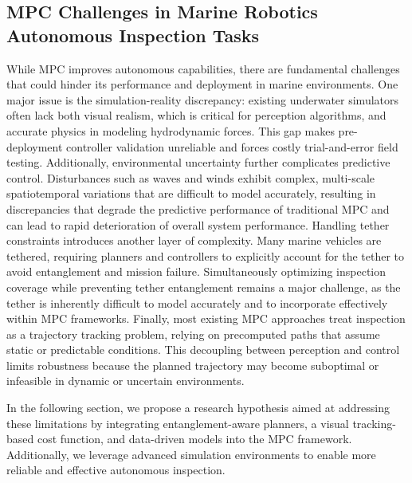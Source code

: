 \subsection{\ac{MPC} Challenges in Marine Robotics Autonomous Inspection Tasks}

While MPC improves autonomous capabilities, there are fundamental challenges that could hinder its performance and deployment in marine environments. One major issue is the simulation-reality discrepancy: existing underwater simulators often lack both visual realism, which is critical for perception algorithms, and accurate physics in modeling hydrodynamic forces. This gap makes pre-deployment controller validation unreliable and forces costly trial-and-error field testing. Additionally, environmental uncertainty further complicates predictive control. Disturbances such as waves and winds exhibit complex, multi-scale spatiotemporal variations that are difficult to model accurately, resulting in discrepancies that degrade the predictive performance of traditional MPC and can lead to rapid deterioration of overall system performance. Handling tether constraints introduces another layer of complexity. Many marine vehicles are tethered, requiring planners and controllers to explicitly account for the tether to avoid entanglement and mission failure. Simultaneously optimizing inspection coverage while preventing tether entanglement remains a major challenge, as the tether is inherently difficult to model accurately and to incorporate effectively within MPC frameworks. Finally, most existing MPC approaches treat inspection as a trajectory tracking problem, relying on precomputed paths that assume static or predictable conditions. This decoupling between perception and control limits robustness because the planned trajectory may become suboptimal or infeasible in dynamic or uncertain environments.





In the following section, we propose a research hypothesis aimed at addressing these limitations by integrating entanglement-aware planners, a visual tracking-based cost function, and data-driven models into the \ac{MPC} framework. Additionally, we leverage advanced simulation environments to enable more reliable and effective autonomous inspection.
